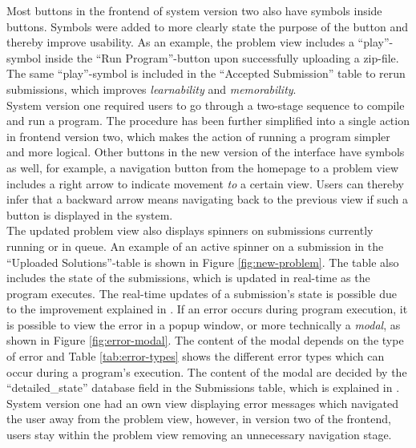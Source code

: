 Most buttons in the frontend of system version two also have symbols inside buttons. Symbols were added to more clearly state the purpose of the button and thereby improve usability. As an example, the problem view includes a ``play''-symbol inside the ``Run Program''-button upon successfully uploading a zip-file. The same ``play''-symbol is included in the ``Accepted Submission'' table to rerun submissions, which improves \textit{learnability} and \textit{memorability}. \\

System version one required users to go through a two-stage sequence to compile and run a program. The procedure has been further simplified into a single action in frontend version two, which makes the action of running a program simpler and more logical. Other buttons in the new version of the interface have symbols as well, for example, a navigation button from the homepage to a problem view includes a right arrow to indicate movement \textit{to} a certain view. Users can thereby infer that a backward arrow means navigating back to the previous view if such a button is displayed in the system. \\

The updated problem view also displays spinners on submissions currently running or in queue. An example of an active spinner on a submission in the ``Uploaded Solutions''-table is shown in Figure \ref{fig:new-problem}. The table also includes the state of the submissions, which is updated in real-time as the program executes. The real-time updates of a submission's state is possible due to the improvement explained in . If an error occurs during program execution, it is possible to view the error in a popup window, or more technically a \textit{modal}, as shown in Figure \ref{fig:error-modal}. The content of the modal depends on the type of error and Table \ref{tab:error-types} shows the different error types which can occur during a program's execution. The content of the modal are decided by the ``detailed\_state'' database field in the Submissions table, which is explained in . System version one had an own view displaying error messages which navigated the user away from the problem view, however, in version two of the frontend, users stay within the problem view removing an unnecessary navigation stage. \\

